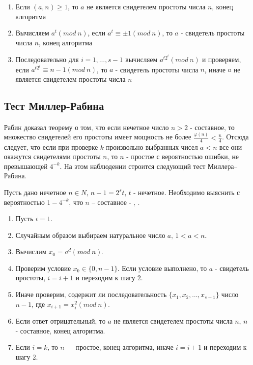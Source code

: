   \begin{enumerate}
   \item Если {$(a, n) \ge 1$}, то {$a$} не является свидетелем простоты числа {$n$}, конец алгоритма
   \item Вычисляем {$a^{ t} (mod \: n)$}, если {$a^{ t} \equiv \pm 1(mod \: n)$}, то {$a$}
    - свидетель простоты числа {$n$}, конец алгоритма
   \item Последовательно для {$i=1, \dots, s - 1$} вычисляем {$a^{ t 2^{ i}}(mod \: n)$} и 
    проверяем, если {$a^{ t 2^{ i}} \equiv n - 1 (mod \: n)$}, то {$a$} - 
    свидетель простоты числа {$n$}, иначе {$a$} не является свидетелем простоты числа {$n$}
  \end{enumerate}

  
\subsection{Тест Миллер-Рабина}

\paragraph{} Рабин доказал теорему о том, что если нечетное число $n > 2$ - составное, то множество свидетелей его простоты имеет мощность не более
$\frac{\varphi(n)}{4} < \frac{n}{4}$. Отсюда следует, что если при проверке $k$ произвольно выбранных чисел $a < n$ все они окажутся свидетелями простоты $n$, то $n$ -
простое с вероятностью ошибки, не превышающей $4^{ -k}$. На этом наблюдении строится следующий тест Миллера–Рабина.

Пусть дано нечетное {$n \in N$}, {$n - 1 = 2^{ s} t$}, {$t$} - нечетное. Необходимо выяснить 
с вероятностью {$1 - 4^{ -k}$}, что {$n$} – составное - \cite[Глава 1.10, страницы 27-29]{ish11},
\cite[Глава 5.1.3, страницы 183-192]{mah06}.
  
  \begin{enumerate}
   \item Пусть {$i = 1$}.
   \item Случайным образом выбираем натуральное число {$a$}, {$1 < a < n$}.
   \item Вычислим $x_0 = a^d (mod \: n)$.
   \item Проверим условие $x_0 \in \{0, n-1\}$. Если условие выполнено, то $a$ - свидетель простоты, {$i = i + 1$} и переходим к шагу 2.
   \item Иначе проверим, содержит ли последовательность $\{ x_1, x_2, \dots, x_{s-1} \}$ число $n-1$, где $x_{i+1}=x^{2}_i (mod \: n)$. 
   \item Если ответ отрицательный, то {$a$} не является свидетелем простоты числа {$n$}, {$n$} - составное, конец алгоритма.
   \item Если {$i = k$}, то {$n$} — простое, конец алгоритма, иначе {$i = i + 1$} и переходим к шагу 2.
  \end{enumerate}

